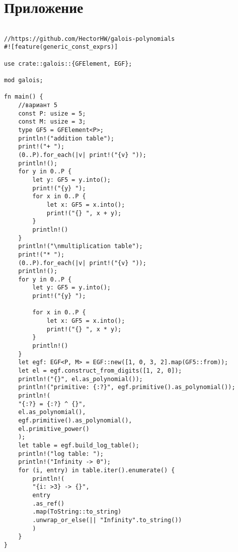 \documentclass[a4paper,14pt]{extarticle}
\begin{document}
	\section*{Приложение}
	\begin{Verbatim}[fontsize=\small, baselinestretch=0.78]

//https://github.com/HectorHW/galois-polynomials
#![feature(generic_const_exprs)]

use crate::galois::{GFElement, EGF};

mod galois;

fn main() {
	//вариант 5
	const P: usize = 5;
	const M: usize = 3;
	type GF5 = GFElement<P>;
	println!("addition table");
	print!("+ ");
	(0..P).for_each(|v| print!("{v} "));
	println!();
	for y in 0..P {
		let y: GF5 = y.into();
		print!("{y} ");
		for x in 0..P {
			let x: GF5 = x.into();
			print!("{} ", x + y);
		}
		println!()
	}
	println!("\nmultiplication table");
	print!("* ");
	(0..P).for_each(|v| print!("{v} "));
	println!();
	for y in 0..P {
		let y: GF5 = y.into();
		print!("{y} ");
		
		for x in 0..P {
			let x: GF5 = x.into();
			print!("{} ", x * y);
		}
		println!()
	}
	let egf: EGF<P, M> = EGF::new([1, 0, 3, 2].map(GF5::from));
	let el = egf.construct_from_digits([1, 2, 0]);
	println!("{}", el.as_polynomial());
	println!("primitive: {:?}", egf.primitive().as_polynomial());
	println!(
	"{:?} = {:?} ^ {}",
	el.as_polynomial(),
	egf.primitive().as_polynomial(),
	el.primitive_power()
	);
	let table = egf.build_log_table();
	println!("log table: ");
	println!("Infinity -> 0");
	for (i, entry) in table.iter().enumerate() {
		println!(
		"{i: >3} -> {}",
		entry
		.as_ref()
		.map(ToString::to_string)
		.unwrap_or_else(|| "Infinity".to_string())
		)
	}
}
	\end{Verbatim}
	
	
\end{document}
